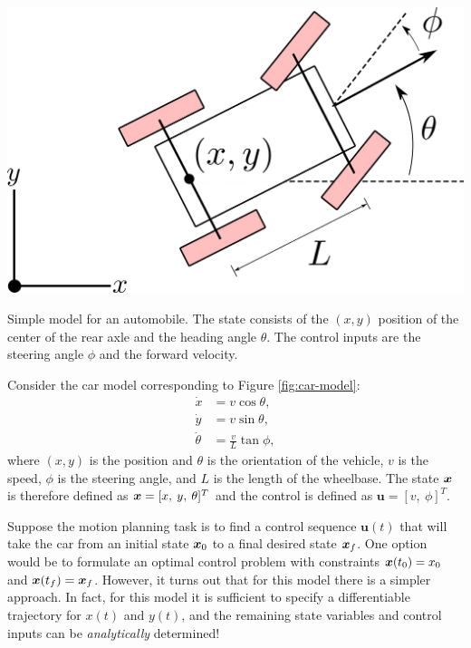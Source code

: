 \begin{example} \label{ex:carflatness}
\theoremstyle{definition}
\begin{marginfigure}
    \centering 
    \includegraphics[width=0.95\linewidth]{tex/figs/ch03_figs/car.png}
    \caption{Simple model for an automobile. The state consists of the $(x,y)$ position of the center of the rear axle and the heading angle $\theta$. The control inputs are the steering angle $\phi$ and the forward velocity.}
    \label{fig:car-model} 
\end{marginfigure} 
Consider the car model corresponding to Figure \ref{fig:car-model}:
\begin{equation} \label{eq:car-dynamics}
\begin{split}
    \dot{x} &= v\cos\theta,\\
    \dot{y} &= v\sin\theta,\\
    \dot{\theta} &= \frac{v}{L}\tan\phi, 
\end{split}
\end{equation}
where $(x, y)$ is the position and $\theta$ is the orientation of the vehicle, $v$ is the speed, $\phi$ is the steering angle, and $L$ is the length of the wheelbase. The state $\bm{x}$ is therefore defined as $\bm{x} = [x, \: y, \: \theta]^T$ and the control is defined as $\bm{u} = [v, \:\phi]^T$.

Suppose the motion planning task is to find a control sequence $\bm{u}(t)$ that will take the car from an initial state $\bm{x}_0$ to a final desired state $\bm{x}_{f}$. One option would be to formulate an optimal control problem with constraints $\bm{x}(t_0) = x_0$ and $\bm{x}(t_f) = \bm{x}_f$. However, it turns out that for this model there is a simpler approach. In fact, for this model it is sufficient to specify a differentiable trajectory for $x(t)$ and $y(t)$, and the remaining state variables and control inputs can be \textit{analytically} determined!


\end{example}
